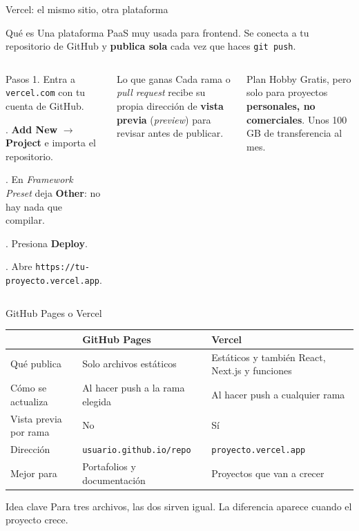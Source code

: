 \documentclass[aspectratio=169,10pt,c]{beamer}
\begin{document}
\begin{frame}{Vercel: el mismo sitio, otra plataforma}
\begin{block}{Qué es}
\small Una plataforma PaaS muy usada para frontend. Se conecta a tu repositorio de GitHub y \textbf{publica sola} cada vez que haces \texttt{git push}.
\end{block}
\begin{columns}[T,onlytextwidth]
\begin{exampleblock}{Pasos}
\small
1. Entra a \texttt{vercel.com} con tu cuenta de GitHub.\par{}. \textbf{Add New} $\rightarrow$ \textbf{Project} e importa el repositorio.\par{}. En \emph{Framework Preset} deja \textbf{Other}: no hay nada que compilar.\par{}. Presiona \textbf{Deploy}.\par{}. Abre \texttt{https://tu-proyecto.vercel.app}.
\end{exampleblock}
\begin{block}{Lo que ganas}
\small Cada rama o \emph{pull request} recibe su propia dirección de \textbf{vista previa} (\emph{preview}) para revisar antes de publicar.
\end{block}
\begin{alertblock}{Plan Hobby}
\small Gratis, pero solo para proyectos \textbf{personales, no comerciales}. Unos 100 GB de transferencia al mes.
\end{alertblock}
\end{columns}
\end{frame}

\begin{frame}{GitHub Pages o Vercel}
\renewcommand{\arraystretch}{1.35}
\centering\small
\begin{tabular}{@{}p{3.6cm}p{4.6cm}p{4.6cm}@{}}
\toprule
& \textbf{GitHub Pages} & \textbf{Vercel}\\
\midrule
Qué publica & Solo archivos estáticos & Estáticos y también React, Next.js y funciones\\
Cómo se actualiza & Al hacer push a la rama elegida & Al hacer push a cualquier rama\\
Vista previa por rama & No & Sí\\
Dirección & \texttt{usuario.github.io/repo} & \texttt{proyecto.vercel.app}\\
Mejor para & Portafolios y documentación & Proyectos que van a crecer\\
\bottomrule
\end{tabular}
\par\vspace{4mm}
\begin{block}{Idea clave}
\small Para tres archivos, las dos sirven igual. La diferencia aparece cuando el proyecto crece.
\end{block}
\end{frame}
\end{document}
